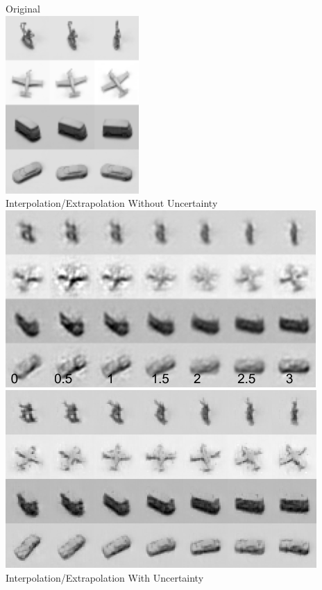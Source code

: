 \documentclass{beamer}
\begin{document}
\begin{frame} 
\begin{centering} 
\tiny Original \\
\includegraphics[scale=0.3]{./Figures/Project2/taco/original.png}\\
Interpolation/Extrapolation Without Uncertainty \\
\includegraphics[scale=0.3]{./Figures/Project2/taco/siamese_interp_num.png} \hspace{0.25cm} 
\includegraphics[scale=0.3]{./Figures/Project2/taco/interp_pool_best_reg.png}\\
Interpolation/Extrapolation With Uncertainty \\

\end{centering}
\end{frame}
\end{document}
